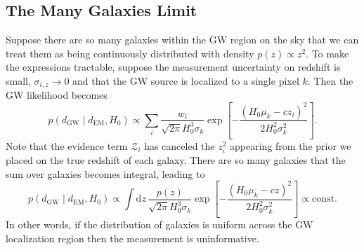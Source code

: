 \documentclass[modern]{article}
\newcommand{\dd}{\mathrm{d}}
\newcommand{\dEM}{d_{\mathrm{EM}}}
\newcommand{\dGW}{d_{\mathrm{GW}}}
\begin{document}
\subsection{The Many Galaxies Limit}

Suppose there are so many galaxies within the \ac{GW} region on the sky that we
can treat them as being continuously distributed with density $p\left( z \right)
\propto z^2$.  To make the expressions tractable, suppose the measurement
uncertainty on redshift is small, $\sigma_{i,z} \to 0$ and that the \ac{GW}
source is localized to a single pixel $k$.  Then the \ac{GW} likelihood becomes
%
\begin{equation}
  p\left( \dGW \mid \dEM, H_0 \right) \propto \sum_i \frac{w_i}{\sqrt{2\pi} H_0^3 \sigma_k} \exp\left[ - \frac{\left( H_0 \mu_k - c z_i \right)^2}{2 H_0^2 \sigma_k^2} \right].
\end{equation}
%
Note that the evidence term $\mathcal{Z}_i$ has canceled the $z_i^2$ appearing
from the prior we placed on the true redshift of each galaxy.  There are so many
galaxies that the sum over galaxies becomes integral, leading to
%
\begin{equation}
  p\left( \dGW \mid \dEM, H_0 \right) \propto \int \dd z \, \frac{p(z)}{\sqrt{2\pi} H_0^3 \sigma_k} \exp\left[ - \frac{\left( H_0 \mu_k - c z \right)^2}{2 H_0^2 \sigma_k^2} \right] \propto \mathrm{const}.
\end{equation}
%
In other words, if the distribution of galaxies is uniform across the \ac{GW}
localization region then the measurement is uninformative.


\newpage
\printbibliography
\end{document}
